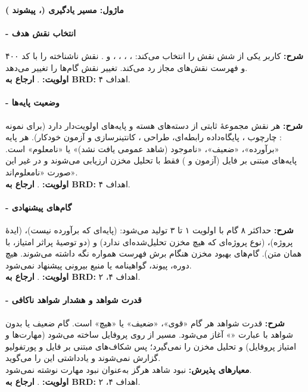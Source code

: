 \documentclass[12pt]{article}
\newcommand{\code}[1]{\lr{\texttt{#1}}}
\begin{document}
 \paragraph{ماژول: مسیر یادگیری (، پیشوند )}
 \paragraph{ - انتخاب نقش هدف}
\textbf{شرح:} کاربر یکی از شش نقش را انتخاب می‌کند: ، ، ، ،  و . \code{GET /api/learning-path/[user]?role=<role>} نقش ناشناخته را با کد ۴۰۰ و فهرست نقش‌های مجاز رد می‌کند. تغییر نقش گام‌ها را تغییر می‌دهد.
\\
\textbf{اولویت:} . \textbf{ارجاع به BRD:} اهداف ۴.
 \paragraph{ - وضعیت پایه‌ها}
\textbf{شرح:} هر نقش مجموعهٔ ثابتی از دسته‌های هسته و پایه‌های اولویت‌دار دارد (برای نمونه : چارچوب ، پایگاه‌داده رابطه‌ای، طراحی ، کانتینرسازی و آزمون خودکار). هر پایه «برآورده»، «ضعیف»، «ناموجود (شاهد عمومی یافت نشد)» یا «نامعلوم» است. پایه‌های مبتنی بر فایل (آزمون و ) فقط با تحلیل مخزن ارزیابی می‌شوند و در غیر این صورت «نامعلوم‌اند».
\\
\textbf{اولویت:} . \textbf{ارجاع به BRD:} اهداف ۴.
 \paragraph{ - گام‌های پیشنهادی}
\textbf{شرح:} حداکثر ۸ گام با اولویت ۱ تا ۳ تولید می‌شود:  (پایه‌ای که برآورده نیست)،  (ایدهٔ پروژه)،  (نوع پروژه‌ای که هیچ مخزن تحلیل‌شده‌ای ندارد) و  (دو توصیهٔ پراثر امتیاز، با همان متن). گام‌های بهبود مخزن هنگام برش فهرست همواره نگه داشته می‌شوند. هیچ دوره، پیوند، گواهینامه یا منبع بیرونی پیشنهاد نمی‌شود.
\\
\textbf{اولویت:} . \textbf{ارجاع به BRD:} اهداف ۴، ۲.
 \paragraph{ - قدرت شواهد و هشدار شواهد ناکافی}
\textbf{شرح:} قدرت شواهد هر گام «قوی»، «ضعیف» یا «هیچ» است. گام ضعیف یا بدون شواهد با عبارت «» آغاز می‌شود. مسیر از روی پروفایل ساخته می‌شود (مهارت‌ها و امتیاز پروفایل) و تحلیل مخزن را نمی‌گیرد؛ پس شکاف‌های مبتنی بر فایل و پورتفولیو گزارش نمی‌شوند و یادداشتی این را می‌گوید.
\\
\textbf{معیارهای پذیرش:} نبود شاهد هرگز به‌عنوان نبود مهارت نوشته نمی‌شود.
\\
\textbf{اولویت:} . \textbf{ارجاع به BRD:} اهداف ۴، ۲.
\end{document}
